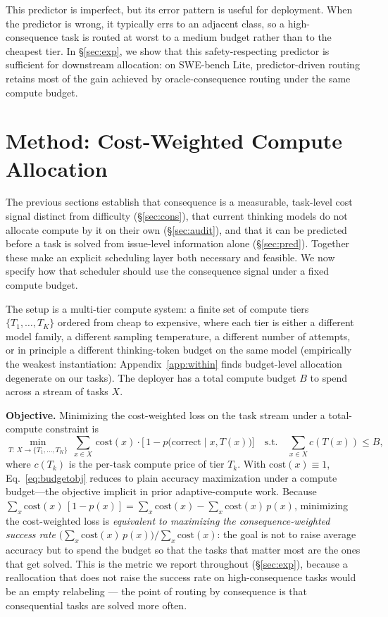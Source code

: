 \documentclass{article}
\begin{document}
This predictor is imperfect, but its error pattern is useful for deployment. When the
predictor is wrong, it typically errs to an adjacent class, so a high-consequence task is routed at worst to a medium budget rather
than to the cheapest tier. In \S\ref{sec:exp}, we show that this
safety-respecting predictor is sufficient for downstream allocation: on SWE-bench Lite, predictor-driven routing retains most of the gain achieved by oracle-consequence routing under the same compute budget.

\section{Method: Cost-Weighted Compute Allocation}
\label{sec:method}
The previous sections establish that consequence is a measurable,
task-level cost signal distinct from difficulty (\S\ref{sec:cons}), that
current thinking models do not allocate compute by it on their own
(\S\ref{sec:audit}), and that it can be predicted before a task is solved
from issue-level information alone (\S\ref{sec:pred}). Together these make
an explicit scheduling layer both necessary and feasible. We now specify
how that scheduler should use the consequence signal under a fixed
compute budget.

The setup is a multi-tier compute system: a finite set of compute tiers $\{T_1, \ldots, T_K\}$ ordered from cheap to expensive, where each tier is either a different model family, a different sampling temperature, a different number of attempts, or in principle a different thinking-token budget on the same model (empirically the weakest instantiation: Appendix~\ref{app:within} finds budget-level allocation degenerate on our tasks). The deployer has a total compute budget $B$ to spend across a stream of tasks $X$.

\textbf{Objective.} Minimizing the cost-weighted loss on the task stream under a total-compute constraint is
\begin{equation}\label{eq:budgetobj}
\min_{T:\,X\to\{T_1,\dots,T_K\}}\ \sum_{x\in X}\, \mathrm{cost}(x)\cdot
\bigl[\,1 - p\bigl(\text{correct}\mid x, T(x)\bigr)\bigr]
\quad\text{s.t.}\quad
\sum_{x\in X} c(T(x)) \leq B,
\end{equation}
where $c(T_k)$ is the per-task compute price of tier $T_k$. With
$\mathrm{cost}(x){\equiv}1$, Eq.~\ref{eq:budgetobj} reduces to plain
accuracy maximization under a compute budget---the objective implicit in prior adaptive-compute work.
Because $\sum_x \mathrm{cost}(x)\,[1-p(x)] = \sum_x \mathrm{cost}(x) -
\sum_x \mathrm{cost}(x)\,p(x)$, minimizing the cost-weighted loss is
\emph{equivalent to maximizing the consequence-weighted success rate}
$\big(\sum_x \mathrm{cost}(x)\,p(x)\big)/\sum_x \mathrm{cost}(x)$: the
goal is not to raise average accuracy but to spend the budget so that
the tasks that matter most are the ones that get solved. This is the
metric we report throughout (\S\ref{sec:exp}), because a reallocation
that does not raise the success rate on high-consequence tasks would
be an empty relabeling --- the point of routing by consequence is that
consequential tasks are solved more often.
\end{document}
